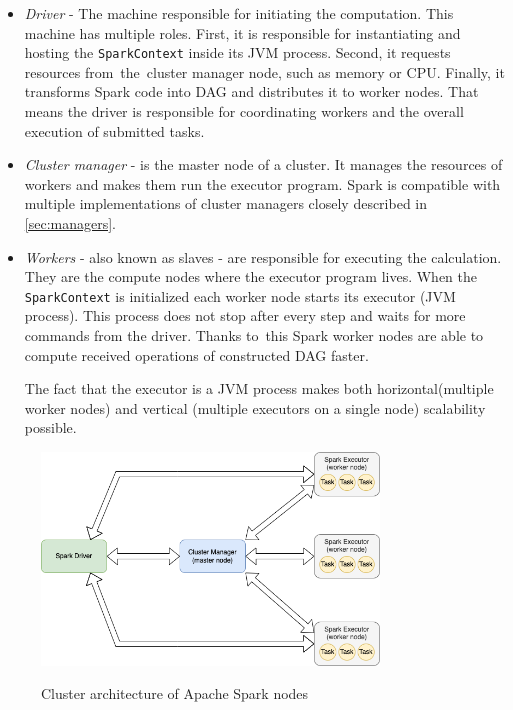 \begin{itemize}
\item \textit{Driver} - The machine responsible for initiating the computation. This machine has multiple roles. First, it is responsible for instantiating and hosting the \texttt{SparkContext} inside its JVM process. Second, it requests resources from~the~cluster manager node, such as memory or CPU. Finally, it transforms Spark code into DAG and distributes it to worker nodes. 
That means the driver is responsible for coordinating workers and the overall execution of submitted tasks. 

\item \textit{Cluster manager} - is the master node of a cluster. It manages the resources of workers and makes them run the executor program. Spark is compatible with multiple implementations of cluster managers closely described in \ref{sec:managers}.
\item \textit{Workers} - also known as slaves - are responsible for executing the calculation. They are the compute nodes where the executor program lives. When the \texttt{SparkContext} is initialized each worker node starts its executor (JVM process). This process does not stop after every step and waits for more commands from the driver. Thanks to~this Spark worker nodes are able to compute received operations of constructed DAG faster. 

The fact that the executor is a JVM process makes both horizontal(multiple worker nodes) and vertical (multiple executors on a single node) scalability possible.

\end{itemize}



\begin{figure}[H]
\centering
\includegraphics[width=0.8\textwidth]{obrazky-figures/spark-architecture.png}
\label{fig:architecture}
\caption{Cluster architecture of Apache Spark nodes}
\end{figure}

